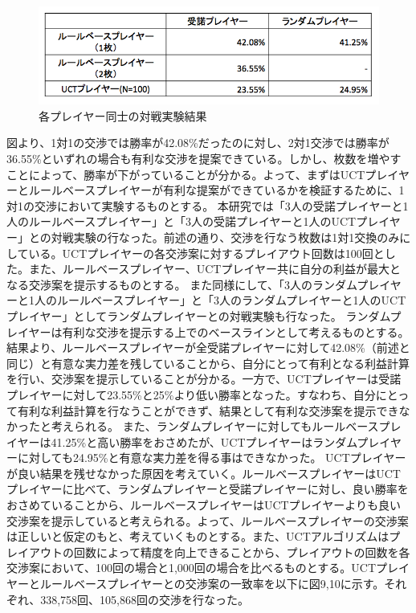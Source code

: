 \documentclass[a4, 10pt,dvipdfmx]{jsarticle}
\begin{document}
\begin{figure}[b]
    \begin{center}
      \includegraphics[width=120mm]{img/eachplayer.png}
    \end{center}
    \caption{各プレイヤー同士の対戦実験結果}
    \label{eachplayer}
\end{figure}


図より、1対1の交渉では勝率が42.08\%だったのに対し、2対1交渉では勝率が36.55\%といずれの場合も有利な交渉を提案できている。しかし、枚数を増やすことによって、勝率が下がっていることが分かる。よって、まずはUCTプレイヤーとルールベースプレイヤーが有利な提案ができているかを検証するために、1対1の交渉において実験するものとする。
本研究では「3人の受諾プレイヤーと1人のルールベースプレイヤー」と「3人の受諾プレイヤーと1人のUCTプレイヤー」との対戦実験の行なった。前述の通り、交渉を行なう枚数は1対1交換のみにしている。UCTプレイヤーの各交渉案に対するプレイアウト回数は100回とした。また、ルールベースプレイヤー、UCTプレイヤー共に自分の利益が最大となる交渉案を提示するものとする。
また同様にして、「3人のランダムプレイヤーと1人のルールベースプレイヤー」と「3人のランダムプレイヤーと1人のUCTプレイヤー」としてランダムプレイヤーとの対戦実験も行なった。
ランダムプレイヤーは有利な交渉を提示する上でのベースラインとして考えるものとする。
結果より、ルールベースプレイヤーが全受諾プレイヤーに対して42.08\%（前述と同じ）と有意な実力差を残していることから、自分にとって有利となる利益計算を行い、交渉案を提示していることが分かる。一方で、UCTプレイヤーは受諾プレイヤーに対して23.55\%と25\%より低い勝率となった。すなわち、自分にとって有利な利益計算を行なうことができず、結果として有利な交渉案を提示できなかったと考えられる。
また、ランダムプレイヤーに対してもルールベースプレイヤーは41.25\%と高い勝率をおさめたが、UCTプレイヤーはランダムプレイヤーに対しても24.95\%と有意な実力差を得る事はできなかった。
UCTプレイヤーが良い結果を残せなかった原因を考えていく。ルールベースプレイヤーはUCTプレイヤーに比べて、ランダムプレイヤーと受諾プレイヤーに対し、良い勝率をおさめていることから、ルールベースプレイヤーはUCTプレイヤーよりも良い交渉案を提示していると考えられる。よって、ルールベースプレイヤーの交渉案は正しいと仮定のもと、考えていくものとする。また、UCTアルゴリズムはプレイアウトの回数によって精度を向上できることから、プレイアウトの回数を各交渉案において、100回の場合と1,000回の場合を比べるものとする。UCTプレイヤーとルールベースプレイヤーとの交渉案の一致率を以下に図9,10に示す。それぞれ、338,758回、105,868回の交渉を行なった。
\end{document}
